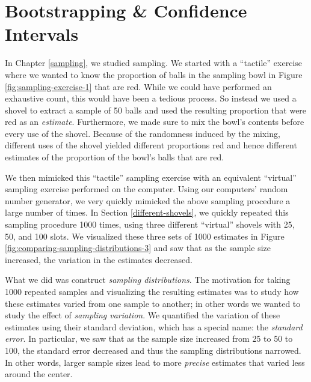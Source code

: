 \documentclass[
]{book}
\begin{document}
\hypertarget{confidence-intervals}{%
\chapter{Bootstrapping \& Confidence Intervals}\label{confidence-intervals}}

In Chapter \ref{sampling}, we studied sampling. We started with a ``tactile'' exercise where we wanted to know the proportion of balls in the sampling bowl in Figure \ref{fig:sampling-exercise-1} that are red. While we could have performed an exhaustive count, this would have been a tedious process. So instead we used a shovel to extract a sample of 50 balls and used the resulting proportion that were red as an \emph{estimate}. Furthermore, we made sure to mix the bowl's contents before every use of the shovel. Because of the randomness induced by the mixing, different uses of the shovel yielded different proportions red and hence different estimates of the proportion of the bowl's balls that are red.

We then mimicked this ``tactile'' sampling exercise with an equivalent ``virtual'' sampling exercise performed on the computer. Using our computers' random number generator, we very quickly mimicked the above sampling procedure a large number of times. In Section \ref{different-shovels}, we quickly repeated this sampling procedure 1000 times, using three different ``virtual'' shovels with 25, 50, and 100 slots. We visualized these three sets of 1000 estimates in Figure \ref{fig:comparing-sampling-distributions-3} and saw that as the sample size increased, the variation in the estimates decreased.

What we did was construct \emph{sampling distributions}. The motivation for taking 1000 repeated samples and visualizing the resulting estimates was to study how these estimates varied from one sample to another; in other words we wanted to study the effect of \emph{sampling variation}. We quantified the variation of these estimates using their standard deviation, which has a special name: the \emph{standard error}. In particular, we saw that as the sample size increased from 25 to 50 to 100, the standard error decreased and thus the sampling distributions narrowed. In other words, larger sample sizes lead to more \emph{precise} estimates that varied less around the center.
\end{document}
